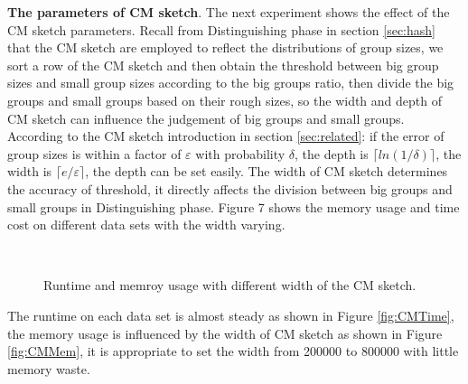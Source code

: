 \textbf{The parameters of CM sketch}. The next experiment shows the effect of the CM sketch parameters. Recall from Distinguishing phase in section \ref{sec:hash} that the CM sketch are employed to reflect the distributions of group sizes, we sort a row of the CM sketch and then obtain the threshold between big group sizes and small group sizes according to the big groups ratio, then divide the big groups and small groups based on their rough sizes, so the width and depth of CM sketch can influence the judgement of big groups and small groups. According to the CM sketch introduction in section \ref{sec:related}: if the error of group sizes is within a factor of $ \varepsilon $ with probability $ \delta$, the depth is $\lceil ln(1/\delta)\rceil $, the width is $\lceil e/\varepsilon\rceil $, the depth can be set easily. The width of CM sketch determines the accuracy of threshold, it directly affects the division between big groups and small groups in Distinguishing phase. Figure 7 shows the memory usage and time cost on different data sets with the width varying.
\begin{figure}[htbp]
	\label{fig: CMPara}
       \hspace{0.23cm}
    \\    
	\caption{Runtime and memroy usage with different width of the CM sketch.}	
	
\end{figure}

The runtime on each data set is almost steady as shown in Figure \ref{fig:CMTime}, the memory usage is influenced by the width of CM sketch as shown in Figure \ref{fig:CMMem}, it is appropriate to set the width from 200000 to 800000 with little memory waste.   

